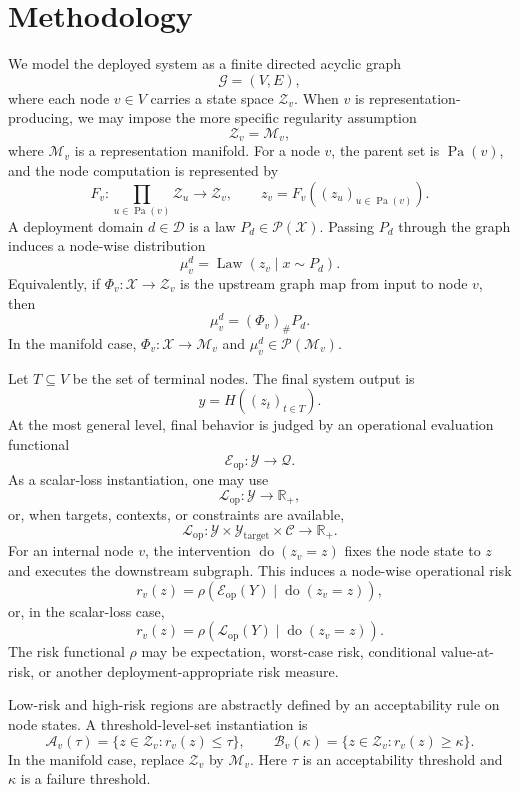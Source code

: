 \documentclass[10pt,twocolumn]{article}
\begin{document}
\section{Methodology}

We model the deployed system as a finite directed acyclic graph
\[
\mathcal{G}=(V,E),
\]
where each node $v\in V$ carries a state space $\mathcal{Z}_v$. When $v$ is representation-producing, we may impose the more specific regularity assumption
\[
\mathcal{Z}_v=\mathcal{M}_v,
\]
where $\mathcal{M}_v$ is a representation manifold. For a node $v$, the parent set is $\operatorname{Pa}(v)$, and the node computation is represented by
\[
F_v:\prod_{u\in\operatorname{Pa}(v)}\mathcal{Z}_u\rightarrow \mathcal{Z}_v,
\qquad
z_v=F_v((z_u)_{u\in\operatorname{Pa}(v)}).
\]
A deployment domain $d\in\mathcal{D}$ is a law $P_d\in\mathcal{P}(\mathcal{X})$. Passing $P_d$ through the graph induces a node-wise distribution
\[
\mu_v^d=\operatorname{Law}(z_v\mid x\sim P_d).
\]
Equivalently, if $\Phi_v:\mathcal{X}\rightarrow\mathcal{Z}_v$ is the upstream graph map from input to node $v$, then
\[
\mu_v^d=(\Phi_v)_{\#}P_d.
\]
In the manifold case, $\Phi_v:\mathcal{X}\rightarrow\mathcal{M}_v$ and $\mu_v^d\in\mathcal{P}(\mathcal{M}_v)$.

Let $T\subseteq V$ be the set of terminal nodes. The final system output is
\[
y=H((z_t)_{t\in T}).
\]
At the most general level, final behavior is judged by an operational evaluation functional
\[
\mathcal{E}_{\mathrm{op}}:\mathcal{Y}\rightarrow\mathcal{Q}.
\]
As a scalar-loss instantiation, one may use
\[
\mathcal{L}_{\mathrm{op}}:\mathcal{Y}\rightarrow\mathbb{R}_{+},
\]
or, when targets, contexts, or constraints are available,
\[
\mathcal{L}_{\mathrm{op}}:\mathcal{Y}\times\mathcal{Y}_{\mathrm{target}}\times\mathcal{C}\rightarrow\mathbb{R}_{+}.
\]
For an internal node $v$, the intervention $\operatorname{do}(z_v=z)$ fixes the node state to $z$ and executes the downstream subgraph. This induces a node-wise operational risk
\[
r_v(z)=\rho\left(\mathcal{E}_{\mathrm{op}}(Y)\mid\operatorname{do}(z_v=z)\right),
\]
or, in the scalar-loss case,
\[
r_v(z)=\rho\left(\mathcal{L}_{\mathrm{op}}(Y)\mid\operatorname{do}(z_v=z)\right).
\]
The risk functional $\rho$ may be expectation, worst-case risk, conditional value-at-risk, or another deployment-appropriate risk measure.

Low-risk and high-risk regions are abstractly defined by an acceptability rule on node states. A threshold-level-set instantiation is
\[
\mathcal{A}_v(\tau)=\{z\in\mathcal{Z}_v:r_v(z)\leq \tau\},
\qquad
\mathcal{B}_v(\kappa)=\{z\in\mathcal{Z}_v:r_v(z)\geq \kappa\}.
\]
In the manifold case, replace $\mathcal{Z}_v$ by $\mathcal{M}_v$. Here $\tau$ is an acceptability threshold and $\kappa$ is a failure threshold.
\end{document}
